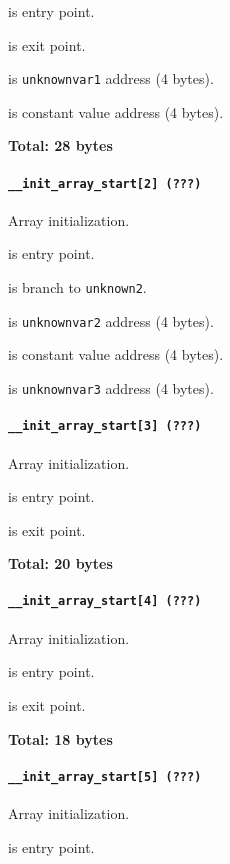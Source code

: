  is entry point.

 is exit point.

 is \texttt{unknownvar1} address (4 bytes).

 is constant value address (4 bytes).

\textbf{Total: 28 bytes}

\paragraph{\texttt{\_\_init\_array\_start[2] (???)}} Array initialization.

 is entry point.

 is branch to \texttt{unknown2}.

 is \texttt{unknownvar2} address (4 bytes).

 is constant value address (4 bytes).

 is \texttt{unknownvar3} address (4 bytes).

\paragraph{\texttt{\_\_init\_array\_start[3] (???)}} Array initialization.

 is entry point.

 is exit point.

\textbf{Total: 20 bytes}

\paragraph{\texttt{\_\_init\_array\_start[4] (???)}} Array initialization.

 is entry point.

 is exit point.

\textbf{Total: 18 bytes}

\paragraph{\texttt{\_\_init\_array\_start[5] (???)}} Array initialization.

 is entry point.

